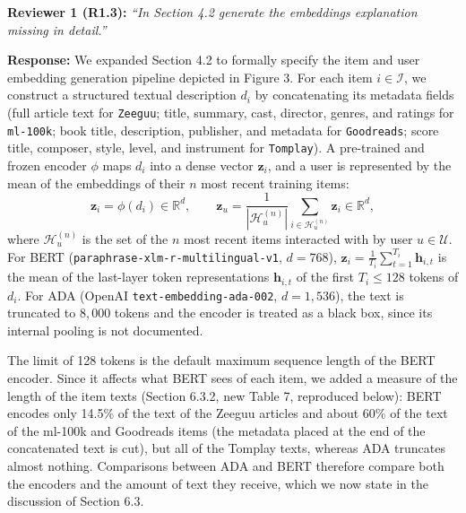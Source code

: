 \documentclass[11pt,a4paper]{article}
\newcommand{\mm}[1]{#1}
\begin{document}
\begin{reviewbox}
\textbf{Reviewer 1 (R1.3):} \textit{``In Section 4.2 generate the embeddings explanation missing in detail.''}
\end{reviewbox}

\noindent\textbf{Response:}
We expanded Section 4.2 to formally specify the item and user embedding generation pipeline depicted in Figure 3. For each item $i \in \mathcal{I}$, we construct a structured textual description $d_i$ by concatenating its metadata fields (full article text for \texttt{Zeeguu}; title, summary, cast, director, genres, and ratings for \texttt{ml-100k}; book title, description, publisher, and metadata for \texttt{Goodreads}; score title, composer, style, level, and instrument for \texttt{Tomplay}). A pre-trained \mm{and frozen} encoder \mm{$\phi$} maps $d_i$ into a dense vector \mm{$\mathbf{z}_i$, and a user is represented by the mean of the embeddings of their $n$ most recent training items}:
\begin{equation}
\mm{\mathbf{z}_i = \phi(d_i)} \in \mathbb{R}^d, \qquad
\mm{\mathbf{z}_u} = \frac{1}{|\mathcal{H}_u^{(n)}|} \sum_{i \in \mathcal{H}_u^{(n)}} \mm{\mathbf{z}_i} \in \mathbb{R}^d,
\label{eq:rebuttal_item_user_emb}
\end{equation}
where $\mathcal{H}_u^{(n)}$ is the set of the $n$ most recent items interacted with by user $u \in \mathcal{U}$\mm{. For BERT (\texttt{paraphrase-xlm-r-\allowbreak multilingual-v1}, $d = 768$), $\mathbf{z}_i = \frac{1}{T_i} \sum_{t=1}^{T_i} \mathbf{h}_{i,t}$ is the mean of the last-layer token representations $\mathbf{h}_{i,t}$ of the first $T_i \le 128$ tokens of $d_i$. For ADA (OpenAI \texttt{text-embedding-\allowbreak ada-002}, $d = 1{,}536$), the text is truncated to $8{,}000$ tokens and the encoder is treated as a black box, since its internal pooling is not documented.}

\mm{The limit of 128 tokens is the default maximum sequence length of the BERT encoder. Since it affects what BERT sees of each item, we added a measure of the length of the item texts (Section 6.3.2, new Table 7, reproduced below): BERT encodes only 14.5\% of the text of the Zeeguu articles and about 60\% of the text of the ml-100k and Goodreads items (the metadata placed at the end of the concatenated text is cut), but all of the Tomplay texts, whereas ADA truncates almost nothing. Comparisons between ADA and BERT therefore compare both the encoders and the amount of text they receive, which we now state in the discussion of Section 6.3.}
\end{document}
